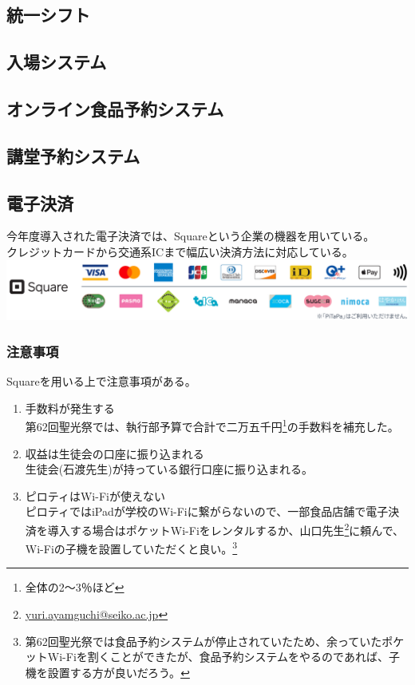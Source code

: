 \documentclass[dvipdfmx,jb5]{jarticle}
\begin{document}
\subsection{統一シフト}
\subsection{入場システム}
\subsection{オンライン食品予約システム}
\subsection{講堂予約システム}
\subsection{電子決済}
 今年度導入された電子決済では、Squareという企業の機器を用いている。\\
 クレジットカードから交通系ICまで幅広い決済方法に対応している。\\
 \includegraphics[scale=0.15]{assets/square_availability.png}
 \subsubsection{注意事項}
 Squareを用いる上で注意事項がある。
 \begin{enumerate}[注意1]
  \item 手数料が発生する\\
  第62回聖光祭では、執行部予算で合計で二万五千円\footnote{全体の2〜3％ほど}の手数料を補充した。
  \item 収益は生徒会の口座に振り込まれる\\
  生徒会(石渡先生)が持っている銀行口座に振り込まれる。
  \item ピロティはWi-Fiが使えない\\
  ピロティではiPadが学校のWi-Fiに繋がらないので、一部食品店舗で電子決済を導入する場合はポケットWi-Fiをレンタルするか、山口先生\footnote{\url{yuri.ayamguchi@seiko.ac.jp}}に頼んで、Wi-Fiの子機を設置していただくと良い。\footnote{第62回聖光祭では食品予約システムが停止されていたため、余っていたポケットWi-Fiを割くことができたが、食品予約システムをやるのであれば、子機を設置する方が良いだろう。}
 \end{enumerate}
\end{document}
